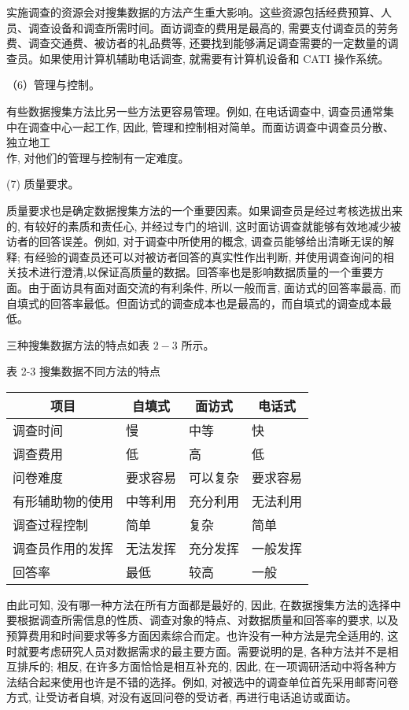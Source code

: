 \documentclass[10pt]{article}
\begin{document}
\begin{CJK*}{UTF8}{bsmi}
实施调查的资源会对搜集数据的方法产生重大影响。这些资源包括经费预算、人员、调查设备和调查所需时间。面访调查的费用是最高的, 需要支付调查员的劳务费、调查交通费、被访者的礼品费等, 还要找到能够满足调查需要的一定数量的调查员。如果使用计算机辅助电话调查, 就需要有计算机设备和 CATI 操作系统。

（6）管理与控制。

有些数据搜集方法比另一些方法更容易管理。例如, 在电话调查中, 调查员通常集中在调查中心一起工作, 因此, 管理和控制相对简单。而面访调查中调查员分散、独立地工\\
作, 对他们的管理与控制有一定难度。

(7) 质量要求。

质量要求也是确定数据搜集方法的一个重要因素。如果调查员是经过考核选拔出来的, 有较好的素质和责任心, 并经过专门的培训, 这时面访调查就能够有效地减少被访者的回答误差。例如, 对于调查中所使用的概念, 调查员能够给出清晰无误的解释; 有经验的调查员还可以对被访者回答的真实性作出判断, 并使用调查询问的相关技术进行澄清,以保证高质量的数据。回答率也是影响数据质量的一个重要方面。由于面访具有面对面交流的有利条件, 所以一般而言, 面访式的回答率最高, 而自填式的回答率最低。但面访式的调查成本也是最高的，而自填式的调查成本最低。

三种搜集数据方法的特点如表 $2-3$ 所示。

表 2-3 搜集数据不同方法的特点

\begin{center}
\begin{tabular}{llll}
\hline
\multicolumn{1}{c}{项目} & \multicolumn{1}{c}{自填式} & \multicolumn{1}{c}{面访式} & \multicolumn{1}{c}{电话式} \\
\hline
调查时间 & 慢 & 中等 & 快 \\
调查费用 & 低 & 高 & 低 \\
问卷难度 & 要求容易 & 可以复杂 & 要求容易 \\
有形辅助物的使用 & 中等利用 & 充分利用 & 无法利用 \\
调查过程控制 & 简单 & 复杂 & 简单 \\
调查员作用的发挥 & 无法发挥 & 充分发挥 & 一般发挥 \\
回答率 & 最低 & 较高 & 一般 \\
\hline
\end{tabular}
\end{center}

由此可知, 没有哪一种方法在所有方面都是最好的, 因此, 在数据搜集方法的选择中要根据调查所需信息的性质、调查对象的特点、对数据质量和回答率的要求, 以及预算费用和时间要求等多方面因素综合而定。也许没有一种方法是完全适用的, 这时就要考虑研究人员对数据需求的最主要方面。需要说明的是, 各种方法并不是相互排斥的; 相反, 在许多方面恰恰是相互补充的, 因此, 在一项调研活动中将各种方法结合起来使用也许是不错的选择。例如, 对被选中的调查单位首先采用邮寄问卷方式, 让受访者自填, 对没有返回问卷的受访者, 再进行电话追访或面访。


\end{CJK*}
\end{document}
